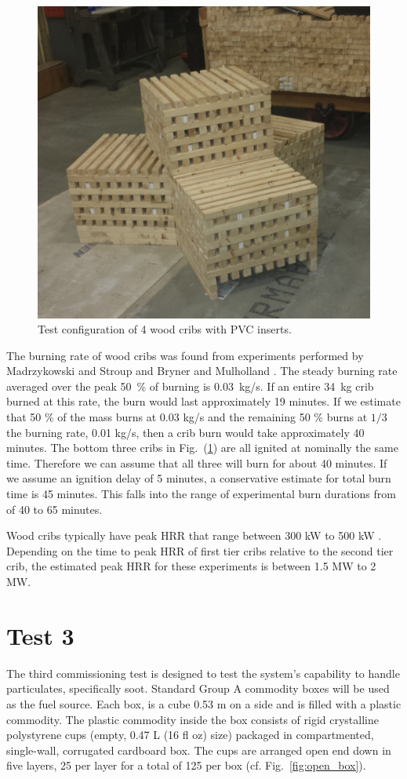 \documentclass[12pt,oneside]{book}
\begin{document}
\begin{figure}
\centering
\includegraphics[width=.7\textwidth]{../Figures/cribs}
\caption {Test configuration of 4 wood cribs with PVC inserts.}
\label{fig:test_crib}
\end{figure}

The burning rate of wood cribs was found from experiments performed by Madrzykowski and Stroup \cite{Madrzykowski1998} and Bryner and Mulholland \cite{Bryner1991}. The steady burning rate averaged over the peak 50~\% of burning is 0.03~kg/s. If an entire 34~kg crib burned at this rate, the burn would last approximately 19 minutes. If we estimate that 50 \% of the mass burns at 0.03 kg/s and the remaining 50 \% burns at $1/3$ the burning rate, 0.01 kg/s, then a crib burn would take approximately 40 minutes. The bottom three cribs in Fig.~(\ref{fig:test_crib}) are all ignited at nominally the same time. Therefore we can assume that all three will burn for about 40 minutes. If we assume an ignition delay of 5 minutes, a conservative estimate for total burn time is 45 minutes. This falls into the range of experimental burn durations from \cite{Bryner1991} of 40 to 65 minutes.

Wood cribs typically have peak HRR that range between 300 kW to 500 kW \cite{Madrzykowski1998,Bryner1991}. Depending on the time to peak HRR of first tier cribs relative to the second tier crib, the estimated peak HRR for these experiments is between 1.5 MW to 2 MW.

\section{Test 3}
\label{test3}
The third commissioning test is designed to test the system's capability to handle particulates, specifically soot. Standard Group A commodity boxes will be used as the fuel source. Each box, is a cube 0.53 m on a side and is filled with a plastic commodity. The plastic commodity inside the box consists of rigid crystalline polystyrene cups (empty, 0.47 L (16 fl oz) size) packaged in compartmented, single-wall, corrugated cardboard box. The cups are arranged open end down in five layers, 25 per layer for a total of 125 per box (cf. Fig.~\ref{fig:open_box}).
\end{document}
